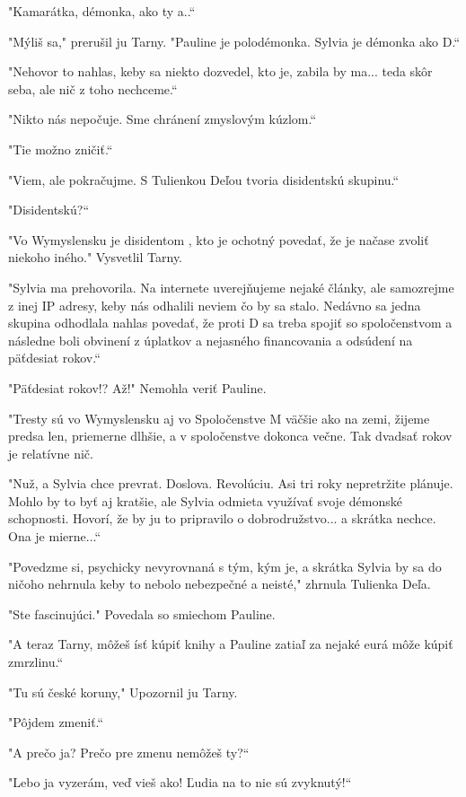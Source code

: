 \documentclass{book}
\begin{document}
"$ $Kamarátka, démonka, ako ty a..“

"$ $Mýliš sa,"$ $ prerušil ju Tarny. "$ $Pauline je polodémonka. Sylvia je démonka ako D.“

"$ $Nehovor to nahlas, keby sa niekto dozvedel, kto je, zabila by ma... teda skôr seba, ale nič z toho nechceme.“

"$ $Nikto nás nepočuje. Sme chránení zmyslovým kúzlom.“

"$ $Tie možno zničiť.“

"$ $Viem, ale pokračujme. S Tulienkou Deľou tvoria disidentskú skupinu.“

"$ $Disidentskú?“

"$ $Vo Wymyslensku je disidentom , kto je ochotný povedať, že je načase zvoliť niekoho iného."$ $ Vysvetlil Tarny.

"$ $Sylvia ma prehovorila. Na internete uverejňujeme nejaké články, ale samozrejme z inej IP adresy, keby nás odhalili neviem čo by sa stalo. Nedávno sa jedna skupina odhodlala nahlas povedať, že proti D sa treba spojiť so spoločenstvom a následne boli obvinení z úplatkov a nejasného financovania a odsúdení na päťdesiat rokov.“

"$ $Päťdesiat rokov!? Až!"$ $ Nemohla veriť Pauline.

"$ $Tresty sú vo Wymyslensku aj vo Spoločenstve M väčšie ako na zemi, žijeme predsa len, priemerne dlhšie, a v spoločenstve dokonca večne. Tak dvadsať rokov je relatívne nič.

"$ $Nuž, a Sylvia chce prevrat. Doslova. Revolúciu. Asi tri roky nepretržite plánuje. Mohlo by to byť aj kratšie, ale Sylvia odmieta využívať svoje démonské schopnosti. Hovorí, že by ju to pripravilo o dobrodružstvo... a skrátka nechce. Ona je mierne...“

"$ $Povedzme si, psychicky nevyrovnaná s tým, kým je, a skrátka Sylvia by sa do ničoho nehrnula keby to nebolo nebezpečné a neisté,"$ $ zhrnula Tulienka Deľa.

"$ $Ste fascinujúci."$ $ Povedala so smiechom Pauline.

"$ $A teraz Tarny, môžeš ísť kúpiť knihy a Pauline zatiaľ za nejaké eurá môže kúpiť zmrzlinu.“

"$ $Tu sú české koruny,"$ $ Upozornil ju Tarny.

"$ $Pôjdem zmeniť.“

"$ $A prečo ja? Prečo pre zmenu nemôžeš ty?“

"$ $Lebo ja vyzerám, veď vieš ako! Ľudia na to nie sú zvyknutý!“
\end{document}
